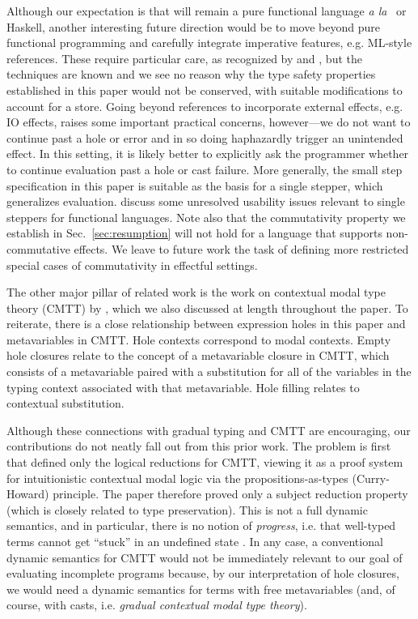 Although our expectation is that \Hazel will remain a pure functional language \emph{a la} \Elm~or Haskell, another interesting future direction would be to move beyond
pure functional programming and carefully integrate imperative features, e.g. ML-style references. These require particular care, as recognized by \citet{Siek06a} and \citet{DBLP:conf/esop/SiekVCTG15}, but the techniques are known and we see no reason why the type safety properties  established in this paper would not be conserved, with suitable modifications to account for a store. Going beyond references to incorporate external effects, e.g. IO effects, raises some important practical concerns, however---we do not want to continue past a hole or error and in so doing haphazardly trigger an unintended effect. In this setting, it is likely better to explicitly ask the programmer whether to continue evaluation past a hole or cast failure. More generally, the small step specification in this paper is suitable as the basis for a single stepper, which generalizes evaluation. \citet{ocaml-stepper} discuss some unresolved usability issues relevant to single steppers for functional languages. Note also that the commutativity property we establish in Sec.~\ref{sec:resumption} will not hold for a language that supports non-commutative effects. We leave to future work the task of defining more restricted special cases of commutativity in effectful settings.


The other major pillar of related work is the work on contextual modal type theory (CMTT) by \citet{Nanevski2008}, which we also discussed at length throughout the paper. To reiterate, there is a close relationship between expression holes in this paper and metavariables in CMTT. Hole contexts correspond to modal contexts.
Empty hole closures 
relate to the concept of a {metavariable closure} in CMTT, which consists
of a metavariable paired with a substitution for all of the variables in the
typing context associated with that metavariable. Hole filling relates to contextual substitution. 

Although these connections with gradual typing and CMTT are encouraging, our contributions do not neatly fall out from this prior work. The problem is first that \citet{Nanevski2008} defined only the logical reductions for CMTT, viewing it as a proof system for intuitionistic contextual modal logic via the propositions-as-types (Curry-Howard) principle. 
The paper therefore proved only a subject reduction property (which is closely related to type preservation). 
This is not a full dynamic semantics, and in particular, there is no notion of \emph{progress}, i.e. that well-typed terms cannot get ``stuck'' in an undefined state \cite{wright94:_type_soundness}. 
In any case, a conventional dynamic semantics for CMTT would not be immediately relevant to our goal of evaluating incomplete programs because, by our interpretation of hole closures, we would need a dynamic semantics for terms with free metavariables (and, of course, with casts, i.e. \emph{gradual contextual modal type theory}).


